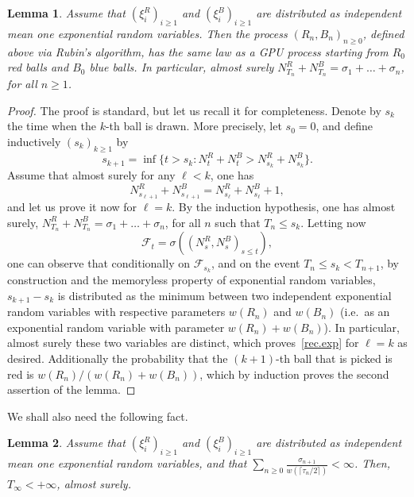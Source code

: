 \documentclass[10pt,a4paper]{amsart}
\newtheorem {lem} {Lemma} [section]
\newcommand{\1}{{\text{\Large $\mathfrak 1$}}}
\begin{document}
\begin{lem}\label{lem:Rubin}
Assume that $(\xi_i^R)_{i\ge 1}$ and $(\xi_i^B)_{i\ge 1}$ are distributed as independent mean one exponential random variables. Then the process $(R_n,B_n)_{n\ge 0}$, defined above via Rubin's algorithm,
has the same law as a GPU process starting from $R_0$ red balls and $B_0$ blue balls. In particular, almost surely $N_{T_n}^R + N_{T_n}^B = \sigma_1+ \dots + \sigma_n$, for all $n\ge 1$. 
\end{lem}
\begin{proof}
The proof is standard, but let us recall it for completeness. Denote by $s_k$ the time when the $k$-th ball is drawn. More precisely, let $s_0 = 0$, and define inductively $(s_k)_{k\ge 1}$ by 
$$s_{k+1} = \inf \{t>s_k : N_t^R + N_t^B > N_{s_k}^R + N_{s_k}^B\}. $$ 
Assume that almost surely for any $\ell < k$, one has 
\begin{equation}\label{rec.exp}
N_{s_{\ell +1}}^R + N_{s_{\ell +1}}^B = N_{s_\ell}^R + N_{s_\ell}^B +1,
\end{equation}
and let us prove it now for $\ell = k$. By the induction hypothesis, one has almost surely, $N_{T_n}^R + N_{T_n}^B = \sigma_1+ \dots + \sigma_n$, for all $n$ such that $T_n \le s_k$. 
Letting now 
\begin{equation}\label{def.Ft}
\mathcal F_t= \sigma((N_s^R,N_s^B)_{s\le t}),
\end{equation}
one can observe that conditionally on $\mathcal F_{s_k}$, and on the event $T_n\le s_k <T_{n+1}$, by construction and the memoryless property of exponential random variables, $s_{k+1} - s_k$ is distributed as the minimum between two independent exponential random variables with respective parameters $w(R_n)$ and $w(B_n)$ (i.e.~as an exponential random variable with parameter $w(R_n) + w(B_n)$). In particular, almost surely these two variables are distinct, which proves~\eqref{rec.exp} for $\ell = k$ as desired. Additionally the probability that the $(k+1)$-th ball 
that is picked is red is $w(R_n)/(w(R_n) + w(B_n))$, which by induction proves the second assertion of the lemma. 
\end{proof}
We shall also need the following fact. 
\begin{lem}\label{lem.Rubin2}
Assume that $(\xi_i^R)_{i\ge 1}$ and $(\xi_i^B)_{i\ge 1}$ are distributed as independent mean one exponential random variables, and that $\sum_{n\ge 0} \frac{\sigma_{n+1}}{w(\lceil \tau_n/2\rceil)}<\infty$. 
Then, $T_\infty<+\infty$, almost surely. 
\end{lem}
\end{document}
